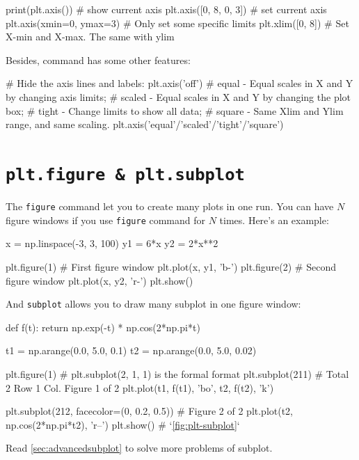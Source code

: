 \documentclass{report}
\begin{document}
\begin{py}
print(plt.axis()) # show current axis
plt.axis([0, 8, 0, 3]) # set current axis
plt.axis(xmin=0, ymax=3) # Only set some specific limits
plt.xlim([0, 8]) # Set X-min and X-max. The same with ylim
\end{py}

Besides,  command has some other features:
\begin{py}
# Hide the axis lines and labels:
plt.axis('off')
# equal - Equal scales in X and Y by changing axis limits;
# scaled - Equal scales in X and Y by changing the plot box;
# tight - Change limits to show all data; 
# square - Same Xlim and Ylim range, and same scaling.
plt.axis('equal'/'scaled'/'tight'/'square')
\end{py}

\section{\texttt{plt.figure \& plt.subplot}}
The \texttt{figure} command let you to create many plots in one run. You can have $N$ figure windows if you use \texttt{figure} command for $N$ times. Here's an example:

\begin{py}
x = np.linspace(-3, 3, 100)
y1 = 6*x
y2 = 2*x**2

plt.figure(1) # First figure window
plt.plot(x, y1, 'b-')
plt.figure(2) # Second figure window
plt.plot(x, y2, 'r-')
plt.show()
\end{py}

And \texttt{subplot} allows you to draw many subplot in one figure window\cite{mplwebsite}:
\begin{py}
def f(t):
    return np.exp(-t) * np.cos(2*np.pi*t)

t1 = np.arange(0.0, 5.0, 0.1)
t2 = np.arange(0.0, 5.0, 0.02)

plt.figure(1)
# plt.subplot(2, 1, 1) is the formal format
plt.subplot(211)  # Total 2 Row 1 Col. Figure 1 of 2
plt.plot(t1, f(t1), 'bo', t2, f(t2), 'k')

plt.subplot(212, facecolor=(0, 0.2, 0.5))  # Figure 2 of 2
plt.plot(t2, np.cos(2*np.pi*t2), 'r--')
plt.show() # `\autoref{fig:plt-subplot}`
\end{py}

Read \autoref{sec:advancedsubplot} to solve more problems of subplot.
\end{document}
